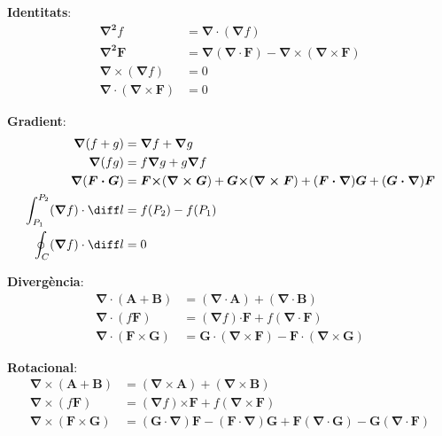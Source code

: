 \documentclass[catalan,a4paper,twoside,11pt]{article}
\begin{document}
\textbf{Identitats}:
\begin{align}
    \boldsymbol{\nabla^2}f &=\boldsymbol{\nabla\cdot}(\boldsymbol{\nabla}f)\\
    \boldsymbol{\nabla^2 F}  &= \boldsymbol{\nabla}(\boldsymbol{\nabla\cdot F})
    - \boldsymbol{\nabla\times}(\boldsymbol{\nabla\times F})\\
    \boldsymbol{\nabla\times}(\boldsymbol{\nabla}f) &= 0\\
    \boldsymbol{\nabla\cdot}(\boldsymbol{\nabla\times F}) &= 0
\end{align}

\textbf{Gradient}:
\begin{align}
    \boldsymbol{\nabla}(f+g) &= \boldsymbol{\nabla}f + \boldsymbol{\nabla}g\\
    \boldsymbol{\nabla}(fg) &= f\boldsymbol{\nabla}g+g\boldsymbol{\nabla}f\\
    \boldsymbol{\nabla}(\boldsymbol{F\cdot G}) &=
    \boldsymbol{F\times}(\boldsymbol{\nabla\times G}) + \boldsymbol{G\times}(\boldsymbol{\nabla\times F}) +
    (\boldsymbol{F\cdot\nabla})\boldsymbol{G} + (\boldsymbol{G\cdot\nabla})\boldsymbol{F}\\
    \int_{P_1}^{P_2} (\boldsymbol{\nabla}f) \cdot \diff l &= f(P_2)-f(P_1)\\
    \oint_C (\boldsymbol{\nabla}f) \cdot \diff l &= 0
\end{align}

\textbf{Diverg\`{e}ncia}:
\begin{align}
    \boldsymbol{\nabla\cdot}(\boldsymbol{A}+\boldsymbol{B}) &= (\boldsymbol{\nabla\cdot A}) +
    (\boldsymbol{\nabla\cdot B})\\
    \boldsymbol{\nabla\cdot}(f\boldsymbol{F}) &=
    (\boldsymbol{\nabla}f)\boldsymbol{\cdot F} + f(\boldsymbol{\nabla\cdot F})\\
       \boldsymbol{\nabla\cdot}(\boldsymbol{F\times G}) &=
    \boldsymbol{G\cdot}(\boldsymbol{\nabla\times F}) -
    \boldsymbol{F\cdot}(\boldsymbol{\nabla\times G})
\end{align}

\textbf{Rotacional}:
\begin{align}
    \boldsymbol{\nabla\times}(\boldsymbol{A}+\boldsymbol{B}) &= (\boldsymbol{\nabla\times A}) + (\boldsymbol{\nabla\times B})\\
    \boldsymbol{\nabla\times}(f\boldsymbol{F}) &=
    (\boldsymbol{\nabla}f)\boldsymbol{\times F} + f(\boldsymbol{\nabla\times F})\\
    \boldsymbol{\nabla\times}(\boldsymbol{F\times G}) &= (\boldsymbol{G\cdot\nabla})\boldsymbol{F} - (\boldsymbol{F\cdot\nabla})\boldsymbol{G} + \boldsymbol{F}(\boldsymbol{\nabla\cdot G}) - \boldsymbol{G}(\boldsymbol{\nabla\cdot F})
\end{align}
\end{document}

